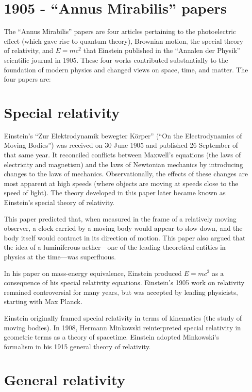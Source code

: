 \documentclass[twoside]{memoir}
\begin{document}
\chapter{1905 - \enquote{Annus Mirabilis} papers}
The \enquote{Annus Mirabilis} papers are four articles pertaining to the photoelectric effect (which gave rise to quantum theory), Brownian motion, the special theory of relativity, and $E = mc^2$ that Einstein published in the \enquote{Annalen der Physik} scientific journal in 1905. These four works contributed substantially to the foundation of modern physics and changed views on space, time, and matter. The four papers are:
\chapter{Special relativity}
Einstein's \enquote{Zur Elektrodynamik bewegter Körper} (\enquote{On the Electrodynamics of Moving Bodies}) was received on 30 June 1905 and published 26 September of that same year. It reconciled conflicts between Maxwell's equations (the laws of electricity and magnetism) and the laws of Newtonian mechanics by introducing changes to the laws of mechanics. Observationally, the effects of these changes are most apparent at high speeds (where objects are moving at speeds close to the speed of light). The theory developed in this paper later became known as Einstein's special theory of relativity.

This paper predicted that, when measured in the frame of a relatively moving observer, a clock carried by a moving body would appear to slow down, and the body itself would contract in its direction of motion. This paper also argued that the idea of a luminiferous aether---one of the leading theoretical entities in physics at the time---was superfluous. \cite{aBfxO}

In his paper on mass-energy equivalence, Einstein produced $E = mc^2$ as a consequence of his special relativity equations. Einstein's 1905 work on relativity remained controversial for many years, but was accepted by leading physicists, starting with Max Planck. \cite{sBl2q}

Einstein originally framed special relativity in terms of kinematics (the study of moving bodies). In 1908, Hermann Minkowski reinterpreted special relativity in geometric terms as a theory of spacetime. Einstein adopted Minkowski's formalism in his 1915 general theory of relativity.
\chapter{General relativity}
\end{document}
